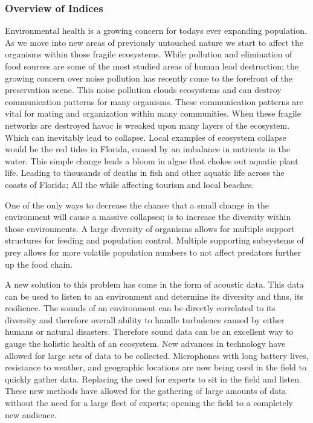 \subsubsection{Overview of Indices}
Environmental health is a growing concern for today\textquotesingle s ever expanding population. As we move into new areas of previously untouched nature we start to affect the organisms within those fragile ecosystems. While pollution and elimination of food sources are some of the most studied areas of human lead destruction; the growing concern over noise pollution has recently come to the forefront of the preservation scene. This noise pollution clouds ecosystems and can destroy communication patterns for many organisms. These communication patterns are vital for mating and organization within many communities. When these fragile networks are destroyed havoc is wreaked upon many layers of the ecosystem.\cite{shannonWiener} Which can inevitably lead to collapse. Local examples of ecosystem collapse would be the red tides in Florida, caused by an imbalance in nutrients in the water. This simple change leads a bloom in algae that chokes out aquatic plant life. Leading to thousands of deaths in fish and other aquatic life across the coasts of Florida; All the while affecting tourism and local beaches.\par
One of the only ways to decrease the chance that a small change in the environment will cause a massive collapses; is to increase the diversity within those environments. A large diversity of organisms allows for multiple support structures for feeding and population control. Multiple supporting subsystems of prey allows for more volatile population numbers to not affect predators further up the food chain.\par
A new solution to this problem has come in the form of acoustic data. This data can be used to listen to an environment and determine its diversity and thus, it\textquotesingle s resilience. The sounds of an environment can be directly correlated to its diversity and therefore overall ability to handle turbulence caused by either humans or natural disasters. Therefore sound data can be an excellent way to gauge the holistic health of an ecosystem. New advances in technology have allowed for large sets of data to be collected. Microphones with long battery lives, resistance to weather, and geographic locations are now being used in the field to quickly gather data. Replacing the need for experts to sit in the field and listen. These new methods have allowed for the gathering of large amounts of data without the need for a large fleet of experts; opening the field to a completely new audience.\cite{urbanBiases}\par

